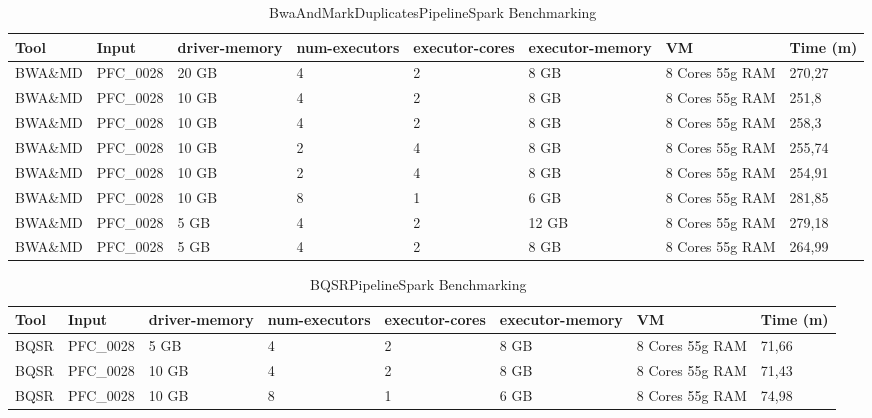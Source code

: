 \begin{table}[h]
	\caption{BwaAndMarkDuplicatesPipelineSpark Benchmarking~\label{BWA_bench}}
	\begin{center}
		\begin{tabular}{| m{5em} | m{5em} | m{3em} | m{4em} | m{4em} | m{5em} | m{4.5em} | m{3em} |}
    		\hline
    		Tool & Input & driver-memory & num-executors & executor-cores & executor-memory & VM & Time (m) \\ \hline
		    BWA\&MD & PFC\_0028 & 20 GB & 4 & 2 & 8 GB & 8 Cores 55g RAM & 270,27 \\ \hline
			BWA\&MD & PFC\_0028 & 10 GB & 4 & 2 & 8 GB & 8 Cores 55g RAM  & 251,8 \\ \hline
			BWA\&MD & PFC\_0028 & 10 GB & 4 & 2 & 8 GB & 8 Cores 55g RAM  & 258,3 \\ \hline
			BWA\&MD & PFC\_0028 & 10 GB & 2 & 4 & 8 GB & 8 Cores 55g RAM  & 255,74 \\ \hline
			BWA\&MD & PFC\_0028 & 10 GB & 2 & 4 & 8 GB & 8 Cores 55g RAM  & 254,91 \\ \hline
			BWA\&MD & PFC\_0028 & 10 GB & 8 & 1 & 6 GB & 8 Cores 55g RAM  & 281,85 \\ \hline
			BWA\&MD & PFC\_0028 & 5 GB & 4 & 2 & 12 GB & 8 Cores 55g RAM  & 279,18 \\ \hline
			BWA\&MD & PFC\_0028 & 5 GB & 4 & 2 & 8 GB & 8 Cores 55g RAM  & 264,99 \\ \hline
            
    	\end{tabular}
    \end{center}
\end{table}

\begin{table}[h]
	\caption{BQSRPipelineSpark Benchmarking~\label{BQSR_bench}}
	\begin{center}
		\begin{tabular}{| m{5em} | m{5em} | m{3em} | m{4em} | m{4em} | m{5em} | m{4.5em} | m{3em} |}
    		\hline
    		Tool & Input & driver-memory & num-executors & executor-cores & executor-memory & VM & Time (m) \\ \hline
		    BQSR & PFC\_0028 & 5 GB & 4 & 2 & 8 GB & 8 Cores 55g RAM & 71,66 \\ \hline
			BQSR & PFC\_0028 & 10 GB & 4 & 2 & 8 GB & 8 Cores 55g RAM  & 71,43 \\ \hline
			BQSR & PFC\_0028 & 10 GB & 8 & 1 & 6 GB & 8 Cores 55g RAM & 74,98 \\ \hline            
    	\end{tabular}
    \end{center}
\end{table}

